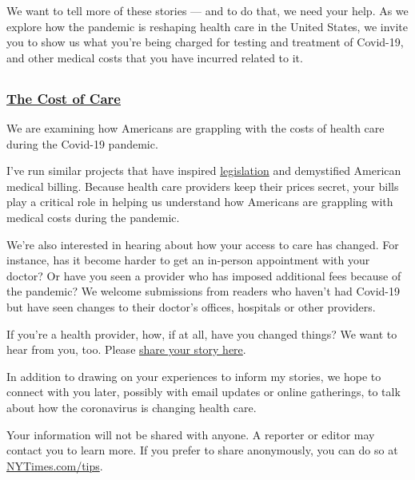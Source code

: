 We want to tell more of these stories --- and to do that, we need your
help. As we explore how the pandemic is reshaping health care in the
United States, we invite you to show us what you're being charged for
testing and treatment of Covid-19, and other medical costs that you have
incurred related to it.

\hypertarget{section}{%
\subsection{}\label{section}}

\hypertarget{the-cost-of-care}{%
\subsubsection{\texorpdfstring{\href{https://www.nytimes3xbfgragh.onion/spotlight/new-york-shuttered}{The
Cost of Care}}{The Cost of Care}}\label{the-cost-of-care}}

We are examining how Americans are grappling with the costs of health
care during the Covid-19 pandemic.

I've run similar projects that have inspired
\href{https://www.vox.com/2019/4/24/18514240/california-surprise-er-bills-zuckerberg}{legislation}
and demystified American medical billing. Because health care providers
keep their prices secret, your bills play a critical role in helping us
understand how Americans are grappling with medical costs during the
pandemic.

We're also interested in hearing about how your access to care has
changed. For instance, has it become harder to get an in-person
appointment with your doctor? Or have you seen a provider who has
imposed additional fees because of the pandemic? We welcome submissions
from readers who haven't had Covid-19 but have seen changes to their
doctor's offices, hospitals or other providers.

If you're a health provider, how, if at all, have you changed things? We
want to hear from you, too. Please
\href{https://www.nytimes3xbfgragh.onion/2020/08/03/reader-center/healthcare-workers-coronavirus-care.html}{share
your story here}.

In addition to drawing on your experiences to inform my stories, we hope
to connect with you later, possibly with email updates or online
gatherings, to talk about how the coronavirus is changing health care.

Your information will not be shared with anyone. A reporter or editor
may contact you to learn more. If you prefer to share anonymously, you
can do so at
\href{https://www.nytimes3xbfgragh.onion/tips}{NYTimes.com/tips}.

